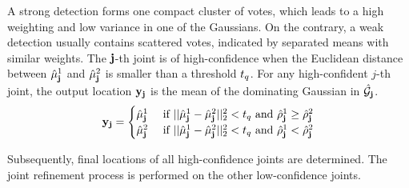 A strong detection forms one compact cluster of votes, which leads to a high weighting and low variance in one of the Gaussians. 
On the contrary, a weak detection usually contains scattered votes, indicated by separated means with similar weights. 
The $\mathbf{j}$-th joint is of high-confidence 
when the Euclidean distance between $\hat{\mu}_{\mathbf{j}}^{1}$ and $\hat{\mu}_{\mathbf{j}}^{2}$ is smaller than a threshold $t_{q}$. 
For any high-confident $j$-th joint, the output location $\mathbf{y}_{\mathbf{j}}$ is the mean of the dominating Gaussian in $\hat{\mathcal{G}}_{\mathbf{j}}$.  
\begin{equation}
	\mathbf{y}_{\mathbf{j}} = 
	\begin{cases}
		\hat{\mu}_{\mathbf{j}}^{1} & \mbox{ if } ||\hat{\mu}_{\mathbf{j}}^{1} - \hat{\mu}_{\mathbf{j}}^{2}||^2_2 < t_{q} \mbox{ and } \hat{\rho}_{\mathbf{j}}^{1} \ge \hat{\rho}_{\mathbf{j}}^{2} \\  
		\hat{\mu}_{\mathbf{j}}^{2} & \mbox{ if } ||\hat{\mu}_{\mathbf{j}}^{1} - \hat{\mu}_{\mathbf{j}}^{2}||^2_2 < t_{q} \mbox{ and } \hat{\rho}_{\mathbf{j}}^{1} < \hat{\rho}_{\mathbf{j}}^{2} \\  
	\end{cases}
	\label{eq:highconf}
\end{equation}

Subsequently, final locations of all high-confidence joints are determined. The joint refinement process is performed on the other low-confidence joints.   

